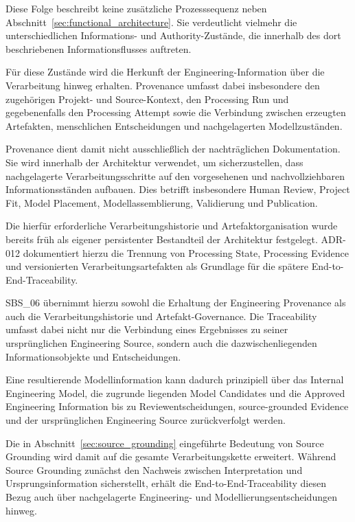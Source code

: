 Diese Folge beschreibt keine zusätzliche Prozesssequenz neben
Abschnitt~\ref{sec:functional_architecture}. Sie verdeutlicht vielmehr die
unterschiedlichen Informations- und Authority-Zustände, die innerhalb des dort
beschriebenen Informationsflusses auftreten.

Für diese Zustände wird die Herkunft der Engineering-Information über die
Verarbeitung hinweg erhalten. Provenance umfasst dabei insbesondere den
zugehörigen Projekt- und Source-Kontext, den Processing Run und gegebenenfalls
den Processing Attempt sowie die Verbindung zwischen erzeugten Artefakten,
menschlichen Entscheidungen und nachgelagerten Modellzuständen.

Provenance dient damit nicht ausschließlich der nachträglichen Dokumentation.
Sie wird innerhalb der Architektur verwendet, um sicherzustellen, dass
nachgelagerte Verarbeitungsschritte auf den vorgesehenen und nachvollziehbaren
Informationsständen aufbauen. Dies betrifft insbesondere Human Review,
Project Fit, Model Placement, Modellassemblierung, Validierung und
Publication.

Die hierfür erforderliche Verarbeitungshistorie und Artefaktorganisation wurde
bereits früh als eigener persistenter Bestandteil der Architektur festgelegt.
ADR-012 dokumentiert hierzu die Trennung von Processing State,
Processing Evidence und versionierten Verarbeitungsartefakten als Grundlage
für die spätere End-to-End-Traceability.

SBS\_06 übernimmt hierzu sowohl die Erhaltung der Engineering Provenance als
auch die Verarbeitungshistorie und Artefakt-Governance. Die Traceability
umfasst dabei nicht nur die Verbindung eines Ergebnisses zu seiner
ursprünglichen Engineering Source, sondern auch die dazwischenliegenden
Informationsobjekte und Entscheidungen.

Eine resultierende Modellinformation kann dadurch prinzipiell über das
Internal Engineering Model, die zugrunde liegenden Model Candidates und die
Approved Engineering Information bis zu Reviewentscheidungen,
source-grounded Evidence und der ursprünglichen Engineering Source
zurückverfolgt werden.

Die in Abschnitt~\ref{sec:source_grounding} eingeführte Bedeutung von
Source Grounding wird damit auf die gesamte Verarbeitungskette erweitert.
Während Source Grounding zunächst den Nachweis zwischen Interpretation und
Ursprungsinformation sicherstellt, erhält die End-to-End-Traceability diesen
Bezug auch über nachgelagerte Engineering- und Modellierungsentscheidungen
hinweg.

